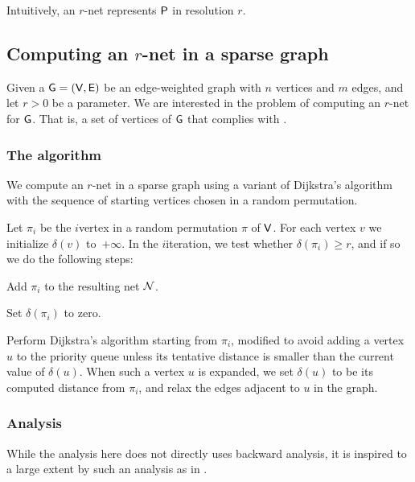 Intuitively, an $r$-net represents ${\mathsf{P}}$ in resolution $r$.


\subsection{Computing an $r$-net in a sparse graph}

Given a $\mathsf{G} = (\mathsf{V}, \mathsf{E})$ be an edge-weighted graph with
$n$ vertices and $m$ edges, and let $r >0$ be a parameter. We are
interested in the problem of computing an $r$-net for $\mathsf{G}$. That
is, a set of vertices of $\mathsf{G}$ that complies with .

\subsubsection{The algorithm}
We compute an $r$-net in a sparse graph using a variant of Dijkstra's
algorithm with the sequence of starting vertices chosen in a random
permutation.

Let $\pi_i$ be the $i$\th vertex in a random permutation $\pi$ of
$\mathsf{V}$. For each vertex $v$ we initialize $\delta(v)$
to~$+\infty$. In the $i$\th iteration, we test whether
$\delta(\pi_i) \geq r$, and if so we do the following steps:
\smallskip
\begin{compactenumA}
    \item Add $\pi_i$ to the resulting net $\mathcal{N}$.
    \item Set $\delta(\pi_i)$ to zero.
    \item Perform Dijkstra's algorithm starting from $\pi_i$, modified
    to avoid adding a vertex $u$ to the priority queue unless its
    tentative distance is smaller than the current value of
    $\delta(u)$. When such a vertex $u$ is expanded, we set
    $\delta(u)$ to be its computed distance from $\pi_i$, and relax
    the edges adjacent to $u$ in the graph.
\end{compactenumA}




\subsubsection{Analysis}

While the analysis here does not directly uses backward analysis, it
is inspired to a large extent by such an analysis as in
.





